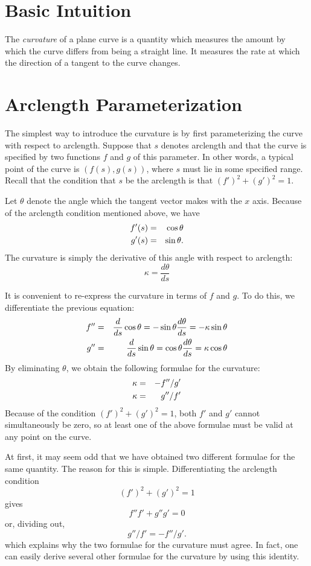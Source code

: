 \documentclass[12pt]{article}
\begin{document}
\section{Basic Intuition}

The \emph{curvature} of a plane curve is a quantity which measures the amount by which the curve differs from being a straight line.  It measures the rate at which the direction of a tangent to the curve changes.

\section{Arclength Parameterization}

The simplest way to introduce the curvature is by first parameterizing the curve with respect to arclength.  Suppose that $s$ denotes arclength and that the curve is specified by two functions $f$ and $g$ of this parameter.  In other words, a typical point of the curve is $(f(s), g(s))$, where $s$ must lie in some specified range.  Recall that the condition that $s$ be the arclength is that $(f')^2 + (g')^2 = 1$.

Let $\theta$ denote the angle which the tangent vector makes with the $x$ axis.  Because of the arclength condition mentioned above, we have
 \begin{eqnarray*}
 f' (s) &=& \cos \theta \cr
 g' (s) &=& \sin \theta .
 \end{eqnarray*}
The curvature is simply the derivative of this angle with respect to arclength:
 \[ \kappa = \frac{d \theta}{d s} \]

It is convenient to re-express the curvature in terms of $f$ and $g$.  To do this, we differentiate the previous equation:
 \begin{eqnarray*} f'' &=& \frac{d}{ds} \cos \theta = - \sin \theta \frac{d \theta}{ds} = - \kappa  \sin \theta \cr
 g'' &=& \frac{d}{ds} \sin \theta =  \cos \theta \frac{d \theta}{ds} =  \kappa  \cos \theta \end{eqnarray*}
By eliminating $\theta$, we obtain the following formulae for the curvature:
\begin{eqnarray*} 
 \kappa &=& -f'' / g' \cr
 \kappa &=& g'' / f' 
\end{eqnarray*}
Because of the condition $(f')^2 + (g')^2 = 1$, both $f'$ and $g'$ cannot simultaneously be zero, so at least one of the above formulae must be valid at any point on the curve.

At first, it may seem odd that we have obtained two different formulae for the same quantity.  The reason for this is simple.  Differentiating the arclength condition
 \[ (f')^2 + (g')^2 = 1 \]
gives
 \[ f'' f' + g'' g' = 0 \]
or, dividing out,
 \[ g'' / f' = - f'' / g' .\]
which explains why the two formulae for the curvature must agree.  In fact, one can easily derive several other formulae for the curvature by using this identity.  
\end{document}
